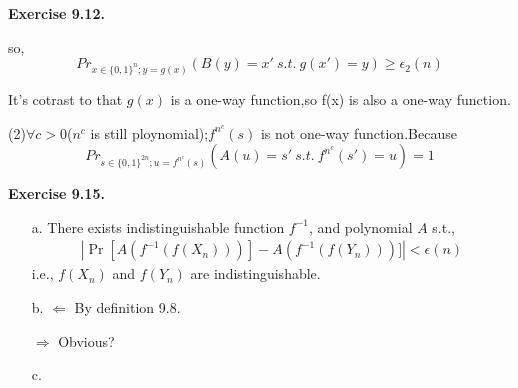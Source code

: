 \documentclass[a4paper]{article}
\newenvironment{exercise}[1]{
	\par
	\noindent\textbf{Exercise #1.}\quad
}{
	\par
	\bigskip
}
\newcommand{\cbra}[1]{\left\{ #1 \right\}}
\newcommand{\bin}{\{0,1\}}
\begin{document}
\begin{exercise}{9.12}
		so,
		\begin{equation}
		Pr_{x\in\{0,1\}^{n};y=g(x)}(B(y)=x'\ s.t.\ g(x')=y)\geq \epsilon_2(n)
		\end{equation}
		
		It's cotrast to that $g(x)$ is a one-way function,so f(x) is also a one-way function.
		
		(2)$\forall c>0$($n^c$ is still ploynomial);$f^{n^c}(s)$ is not one-way function.Because
		\begin{equation}
		Pr_{s\in\{0,1\}^{2n};u=f^{n^c}(s)}(A(u)=s' \ s.t.\  f^{n^c}(s')=u)=1
		\end{equation}
			
	\end{exercise}

	\begin{exercise}{9.15}
		\begin{itemize}
			\item [a.] 
				There exists indistinguishable function $f^{-1}$, and polynomial $A$ s.t.,
				\begin{align*}
					|\Pr[A(f^{-1}(f(X_{n})))] - A(f^{-1}(f(Y_{n})))]|<\epsilon(n)
				\end{align*}
				i.e., $f(X_{n})$ and $f(Y_{n})$ are indistinguishable.

			\item[b.] 
				$\Leftarrow$ By definition 9.8.

				$\Rightarrow$ Obvious?

			\item[c.] 

		\end{itemize}
	\end{exercise}

%
\end{document}
